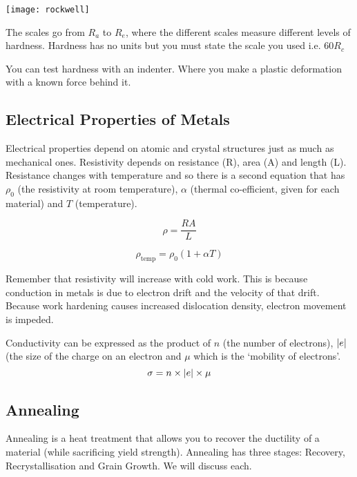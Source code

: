 \documentclass[12pt]{article}
\begin{document}
\begin{multicols}{2}
\texttt{[image: rockwell]}

The scales go from $R_a$ to $R_e$, where the different scales measure different levels of hardness.
Hardness has no units but you must state the scale you used i.e. 60$R_c$

You can test hardness with an indenter.
Where you make a plastic deformation with a known force behind it.

\end{multicols}

\subsection{Electrical Properties of Metals}
Electrical properties depend on atomic and crystal structures just as much as mechanical ones.
Resistivity depends on resistance (R), area (A) and length (L).
Resistance changes with temperature and so there is a second equation that has $\rho_0$ (the resistivity at room temperature), $\alpha$ (thermal co-efficient, given for each material) and $T$ (temperature).

\begin{equation*}
  \rho = \frac{RA}{L}
\end{equation*}

\begin{equation*}
  \rho_{\text{temp}} = \rho_0 (1+\alpha T)
\end{equation*}

Remember that resistivity will increase with cold work.
This is because conduction in metals is due to electron drift and the velocity of that drift.
Because work hardening causes increased dislocation density, electron movement is impeded.

Conductivity can be expressed as the product of $n$ (the number of electrons), $\abs{e}$ (the size of the charge on an electron and $\mu$ which is the `mobility of electrons'. 
\begin{equation*}
  \sigma = n \times \abs{e} \times \mu 
\end{equation*}

\subsection{Annealing}Annealing is a heat treatment that allows you to recover the ductility of a material (while sacrificing yield strength).
Annealing has three stages: Recovery, Recrystallisation and Grain Growth.
We will discuss each.
\end{document}
